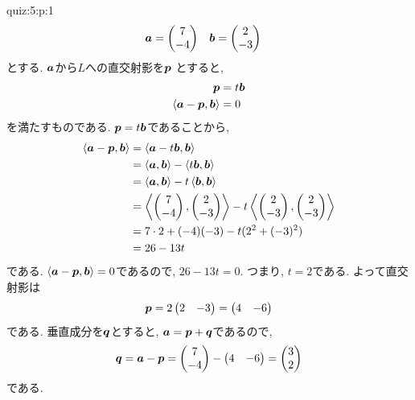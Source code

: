 \begin{answerof}{quiz:5:p:1}
\begin{align*}
  \boldsymbol{a}&=\begin{pmatrix}7\\-4\end{pmatrix}&
  \boldsymbol{b}&=\begin{pmatrix}2\\-3\end{pmatrix}
\end{align*}
とする.
$\boldsymbol{a}$から$L$への直交射影を$\boldsymbol{p}$
とすると,
\begin{align*}
  \boldsymbol{p}&=t\boldsymbol{b}\\
  \Braket{\boldsymbol{a}-\boldsymbol{p},\boldsymbol{b}}&=0
\end{align*}
を満たすものである.
$\boldsymbol{p}=t\boldsymbol{b}$であることから,
\begin{align*}
  \Braket{\boldsymbol{a}-\boldsymbol{p},\boldsymbol{b}}
  &=\Braket{\boldsymbol{a}-t\boldsymbol{b},\boldsymbol{b}}\\
  &=\Braket{\boldsymbol{a},\boldsymbol{b}}-\Braket{t\boldsymbol{b},\boldsymbol{b}}\\
  &=\Braket{\boldsymbol{a},\boldsymbol{b}}-t\Braket{\boldsymbol{b},\boldsymbol{b}}\\
  &=\Braket{\begin{pmatrix}7\\-4\end{pmatrix},\begin{pmatrix}2\\-3\end{pmatrix}}-t\Braket{\begin{pmatrix}2\\-3\end{pmatrix},\begin{pmatrix}2\\-3\end{pmatrix}}\\
  &=7\cdot 2+(-4)(-3)-t(2^2+(-3)^2)\\
  &=26-13t
\end{align*}
である.
$\Braket{\boldsymbol{a}-\boldsymbol{p},\boldsymbol{b}}=0$であるので,
$26-13t=0$.
つまり, $t=2$である.
よって直交射影は
\begin{align*}
  \boldsymbol{p}=2\begin{pmatrix}2&-3\end{pmatrix}=\begin{pmatrix}4&-6\end{pmatrix}
\end{align*}
である.
垂直成分を$\boldsymbol{q}$とすると,
$\boldsymbol{a}=\boldsymbol{p}+\boldsymbol{q}$であるので,
\begin{align*}
  \boldsymbol{q}=\boldsymbol{a}-\boldsymbol{p}
  =\begin{pmatrix}7\\-4\end{pmatrix}-\begin{pmatrix}4&-6\end{pmatrix}
  =\begin{pmatrix}3\\2\end{pmatrix}
\end{align*}
である.


\end{answerof}

